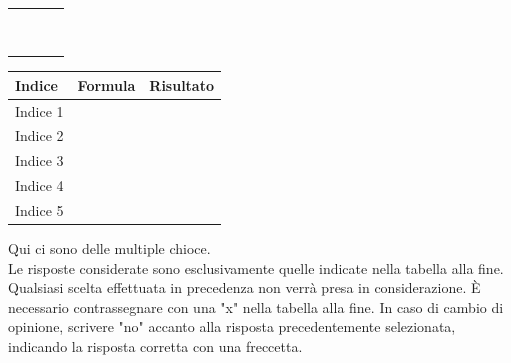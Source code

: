 \documentclass{article}
\begin{document}
\begin{longtable}{|m{6cm}|m{0.5cm}|m{6cm}|m{0.5cm}|}
    \hline
     &  &  &                                          \\
    \hline
     &  &  &                                          \\
    \hline
     &  &  &                                          \\
    \hline
     &  &  &                                          \\
    \hline
     &  &  &                                          \\
    \hline
     &  &  &                                          \\
    \hline
     &  &  &                                          \\
    \hline
     &  &  &                                          \\
    \hline
     &  &  &                                          \\
    \hline
     &  &  &                                          \\
    \hline
\end{longtable}
\label{tab:Stato Patrimoniale}
\newpage
\raggedright
\setlength{\extrarowheight}{10pt} %
\begin{longtable}{|m{3cm}|m{6cm}|m{3cm}|}
    \hline
    Indice   & Formula & Risultato \\
    \hline
    Indice 1 &         &           \\
    \hline
    Indice 2 &         &           \\
    \hline
    Indice 3 &         &           \\
    \hline
    Indice 4 &         &           \\
    \hline
    Indice 5 &         &           \\
    \hline
\end{longtable}
\newpage
\setlength{\extrarowheight}{1pt} %
Qui ci sono delle multiple chioce.\\
Le risposte considerate sono esclusivamente quelle indicate nella tabella alla fine. Qualsiasi scelta effettuata in precedenza non verrà presa in considerazione. È necessario contrassegnare con una "x" nella tabella alla fine. In caso di cambio di opinione, scrivere "no" accanto alla risposta precedentemente selezionata, indicando la risposta corretta con una freccetta.\\
\end{document}
